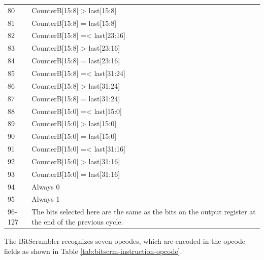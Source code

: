 \documentclass[main\_\_EN.tex]{subfiles}
\begin{document}
\begin{longtable}{ | p{3cm} | p{13cm} | }
80 & CounterB[15:8] > last[15:8] \\
81 & CounterB[15:8] = last[15:8] \\
82 & CounterB[15:8] =< last[23:16] \\
83 & CounterB[15:8] > last[23:16] \\
84 & CounterB[15:8] = last[23:16] \\
85 & CounterB[15:8] =< last[31:24] \\
86 & CounterB[15:8] > last[31:24] \\
87 & CounterB[15:8] = last[31:24] \\
88 & CounterB[15:0] =< last[15:0] \\
89 & CounterB[15:0] > last[15:0] \\
90 & CounterB[15:0] = last[15:0] \\
91 & CounterB[15:0] =< last[31:16] \\
92 & CounterB[15:0] > last[31:16] \\
93 & CounterB[15:0] = last[31:16] \\
94 & Always 0 \\
95 & Always 1 \\
\hline
96-127 & The bits selected here are the same as the bits on the output register at the end of the previous cycle. \\
\hline
\end{longtable}

The BitScrambler recognizes seven opcodes, which are encoded in the opcode fields as shown in Table \ref{tab:bitscrm-instruction-opcode}.
\end{document}
